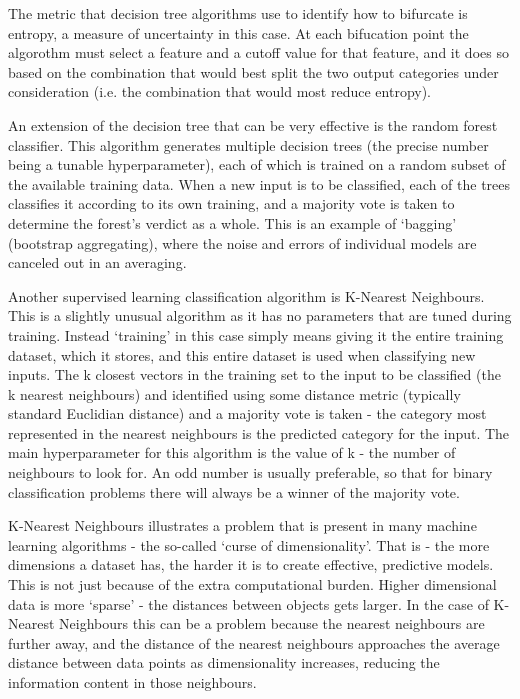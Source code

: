 The metric that decision tree algorithms use to identify how to bifurcate is entropy, a measure of uncertainty in this case. At each bifucation point the algorothm must select a feature and a cutoff value for that feature, and it does so based on the combination that would best split the two output categories under consideration (i.e. the combination that would most reduce entropy).

An extension of the decision tree that can be very effective is the random forest classifier. This algorithm generates multiple decision trees (the precise number being a tunable hyperparameter), each of which is trained on a random subset of the available training data. When a new input is to be classified, each of the trees classifies it according to its own training, and a majority vote is taken to determine the forest's verdict as a whole. This is an example of `bagging' (bootstrap aggregating), where the noise and errors of individual models are canceled out in an averaging.

Another supervised learning classification algorithm is K-Nearest Neighbours. This is a slightly unusual algorithm as it has no parameters that are tuned during training. Instead `training' in this case simply means giving it the entire training dataset, which it stores, and this entire dataset is used when classifying new inputs. The k closest vectors in the training set to the input to be classified (the k nearest neighbours) and identified using some distance metric (typically standard Euclidian distance) and a majority vote is taken - the category most represented in the nearest neighbours is the predicted category for the input. The main hyperparameter for this algorithm is the value of k - the number of neighbours to look for. An odd number is usually preferable, so that for binary classification problems there will always be a winner of the majority vote.

K-Nearest Neighbours illustrates a problem that is present in many machine learning algorithms - the so-called `curse of dimensionality'. That is - the more dimensions a dataset has, the harder it is to create effective, predictive models. This is not just because of the extra computational burden. Higher dimensional data is more `sparse' - the distances between objects gets larger. In the case of K-Nearest Neighbours this can be a problem because the nearest neighbours are further away, and the distance of the nearest neighbours approaches the average distance between data points as dimensionality increases, reducing the information content in those neighbours.

